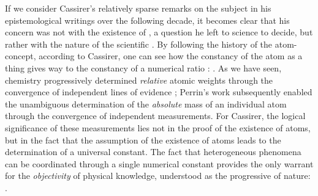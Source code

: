 \documentclass[submitted,12pt]{article}
\renewcommand{\tm}{\footnote{Translation modified}}
\begin{document}
If we consider Cassirer’s relatively sparse remarks on the subject in his epistemological writings over the following decade, it becomes clear that his concern was not with the existence of , a question he left to science to decide, but rather with the nature of the scientific  . By following the history of the atom-concept, according to Cassirer, one can see how the constancy of the atom as a thing  gives way to the constancy of a numerical ratio :  . As we have seen, chemistry progressively determined \emph{relative} atomic weights through the convergence of independent lines of evidence ; Perrin's work subsequently enabled the unambiguous determination of the \emph{absolute} mass of an individual atom through the convergence of independent measurements.  For Cassirer, the logical significance of these measurements lies not in the proof of the existence of atoms, but in the fact that the assumption of the existence of atoms leads to the determination of a universal constant. The fact that heterogeneous phenomena can be coordinated through a single numerical constant provides the only warrant for the \emph{objectivity} of physical knowledge, understood as the progressive  of nature:  \ER{17}{359\tm}.
\end{document}
